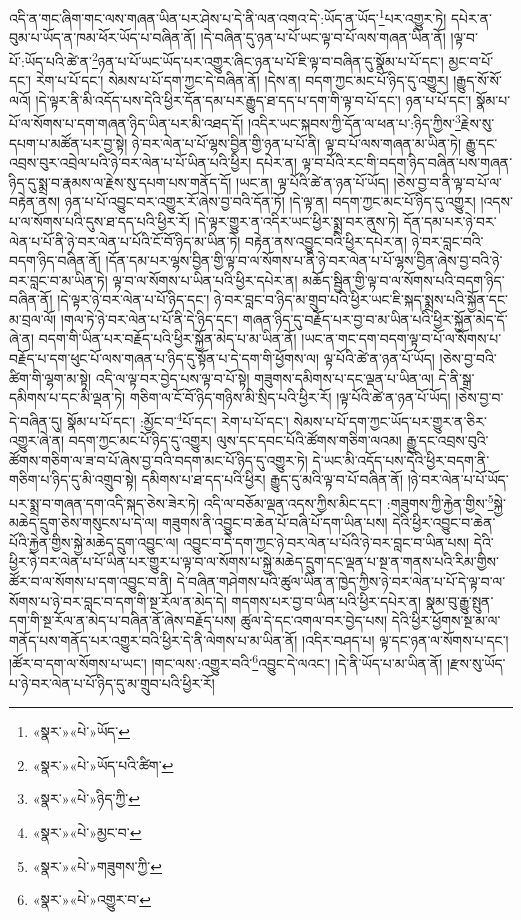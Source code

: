 འདི་ན་གང་ཞིག་གང་ལས་གཞན་ཡིན་པར་ཤེས་པ་དེ་ནི་ལན་འགའ་དེ་:ཡོད་ན་ཡོད་\footnote{«སྣར་»«པེ་»ཡོད་}པར་འགྱུར་ཏེ། དཔེར་ན་བུམ་པ་ཡོད་ན་ཁམ་ཕོར་ཡོད་པ་བཞིན་ནོ། །དེ་བཞིན་དུ་ཉན་པ་པོ་ཡང་ལྟ་བ་པོ་ལས་གཞན་ཡིན་ནོ། །ལྟ་བ་པོ་:ཡོད་པའི་ཚེ་ན་\footnote{«སྣར་»«པེ་»ཡོད་པའི་ཚིག་}ཉན་པ་པོ་ཡང་ཡོད་པར་འགྱུར་ཞིང་ཉན་པ་པོ་ཇི་ལྟ་བ་བཞིན་དུ་སྣོམ་པ་པོ་དང་། མྱང་བ་པོ་དང་། རེག་པ་པོ་དང་། སེམས་པ་པོ་དག་ཀྱང་དེ་བཞིན་ནོ། །དེས་ན། བདག་ཀྱང་མང་པོ་ཉིད་དུ་འགྱུར། །རྒྱུད་སོ་སོ་ལའོ། །དེ་ལྟར་ནི་མི་འདོད་པས་དེའི་ཕྱིར་དོན་དམ་པར་རྒྱུད་ཐ་དད་པ་དག་གི་ལྟ་བ་པོ་དང་། ཉན་པ་པོ་དང་། སྣོམ་པ་པོ་ལ་སོགས་པ་དག་གཞན་ཉིད་ཡིན་པར་མི་འཐད་དོ། །འདིར་ཡང་སྐབས་ཀྱི་དོན་ལ་ཕན་པ་:ཉིད་ཀྱིས་\footnote{«སྣར་»«པེ་»ཉིད་ཀྱི་}རྗེས་སུ་དཔག་པ་མཚོན་པར་བྱ་སྟེ། ཉེ་བར་ལེན་པ་པོ་ལྷས་བྱིན་གྱི་ཉན་པ་པོ་ནི། ལྟ་བ་པོ་ལས་གཞན་མ་ཡིན་ཏེ། རྒྱུ་དང་འབྲས་བུར་འབྲེལ་པའི་ཉེ་བར་ལེན་པ་པོ་ཡིན་པའི་ཕྱིར། དཔེར་ན། ལྟ་བ་པོའི་རང་གི་བདག་ཉིད་བཞིན་པས་གཞན་ཉིད་དུ་སྨྲ་བ་རྣམས་ལ་རྗེས་སུ་དཔག་པས་གནོད་དོ། །ཡང་ན། ལྟ་པོའི་ཚེ་ན་ཉན་པོ་ཡོད། །ཅེས་བྱ་བ་ནི་ལྟ་བ་པོ་ལ་བརྟེན་ནས། ཉན་པ་པོ་འབྱུང་བར་འགྱུར་རོ་ཞེས་བྱ་བའི་དོན་ཏོ། །དེ་ལྟ་ན། བདག་ཀྱང་མང་པོ་ཉིད་དུ་འགྱུར། །འདས་པ་ལ་སོགས་པའི་དུས་ཐ་དད་པའི་ཕྱིར་རོ། །དེ་ལྟར་གྱུར་ན་འདིར་ཡང་ཕྱིར་སྨྲ་བར་ནུས་ཏེ། དོན་དམ་པར་ཉེ་བར་ལེན་པ་པོ་ནི་ཉེ་བར་ལེན་པ་པོའི་ངོ་བོ་ཉིད་མ་ཡིན་ཏེ། བརྟེན་ནས་འབྱུང་བའི་ཕྱིར་དཔེར་ན། ཉེ་བར་བླང་བའི་བདག་ཉིད་བཞིན་ནོ། །དོན་དམ་པར་ལྷས་བྱིན་གྱི་ལྟ་བ་ལ་སོགས་པ་ནི་ཉེ་བར་ལེན་པ་པོ་ལྷས་བྱིན་ཞེས་བྱ་བའི་ཉེ་བར་བླང་བ་མ་ཡིན་ཏེ། ལྟ་བ་ལ་སོགས་པ་ཡིན་པའི་ཕྱིར་དཔེར་ན། མཆོད་སྦྱིན་གྱི་ལྟ་བ་ལ་སོགས་པའི་བདག་ཉིད་བཞིན་ནོ། །དེ་ལྟར་ཉེ་བར་ལེན་པ་པོ་ཉིད་དང་། ཉེ་བར་བླང་བ་ཉིད་མ་གྲུབ་པའི་ཕྱིར་ཡང་ཇི་སྐད་སྨྲས་པའི་སྐྱོན་དང་མ་བྲལ་ལོ། །གལ་ཏེ་ཉེ་བར་ལེན་པ་པོ་ནི་དེ་ཉིད་དང་། གཞན་ཉིད་དུ་བརྗོད་པར་བྱ་བ་མ་ཡིན་པའི་ཕྱིར་སྐྱོན་མེད་དོ་ཞེ་ན། བདག་གི་ཡིན་པར་བརྗོད་པའི་ཕྱིར་སྐྱོན་མེད་པ་མ་ཡིན་ནོ། །ཡང་ན་གང་དག་བདག་ལྟ་བ་པོ་ལ་སོགས་པ་བརྗོད་པ་དག་ཕུང་པོ་ལས་གཞན་པ་ཉིད་དུ་སྟོན་པ་དེ་དག་གི་ཕྱོགས་ལ། ལྟ་པོའི་ཚེ་ན་ཉན་པོ་ཡོད། །ཅེས་བྱ་བའི་ཚིག་གི་ལྷག་མ་སྟེ། འདི་ལ་ལྟ་བར་བྱེད་པས་ལྟ་བ་པོ་སྟེ། གཟུགས་དམིགས་པ་དང་ལྡན་པ་ཡིན་ལ། དེ་ནི་སྒྲ་དམིགས་པ་དང་མི་ལྡན་ཏེ། གཅིག་ལ་ངོ་བོ་ཉིད་གཉིས་མི་སྲིད་པའི་ཕྱིར་རོ། །ལྟ་པོའི་ཚེ་ན་ཉན་པོ་ཡོད། །ཅེས་བྱ་བ་དེ་བཞིན་དུ། སྣོམ་པ་པོ་དང་། :མྱོང་བ་\footnote{«སྣར་»«པེ་»མྱང་བ་}པོ་དང་། རེག་པ་པོ་དང་། སེམས་པ་པོ་དག་ཀྱང་ཡོད་པར་གྱུར་ན་ཅིར་འགྱུར་ཞེ་ན། བདག་ཀྱང་མང་པོ་ཉིད་དུ་འགྱུར། ལུས་དང་དབང་པོའི་ཚོགས་གཅིག་ལའམ། རྒྱུ་དང་འབྲས་བུའི་ཚོགས་གཅིག་ལ་ཟ་བ་པོ་ཞེས་བྱ་བའི་བདག་མང་པོ་ཉིད་དུ་འགྱུར་ཏེ། དེ་ཡང་མི་འདོད་པས་དེའི་ཕྱིར་བདག་ནི་གཅིག་པ་ཉིད་དུ་མི་འགྲུབ་སྟེ། དམིགས་པ་ཐ་དད་པའི་ཕྱིར། རྒྱུད་དུ་མའི་ལྟ་བ་པོ་བཞིན་ནོ། །ཉེ་བར་ལེན་པ་པོ་ཡོད་པར་སྨྲ་བ་གཞན་དག་འདི་སྐད་ཅེས་ཟེར་ཏེ། འདི་ལ་བཅོམ་ལྡན་འདས་ཀྱིས་མིང་དང་། :གཟུགས་ཀྱི་རྐྱེན་གྱིས་\footnote{«སྣར་»«པེ་»གཟུགས་ཀྱི་}སྐྱེ་མཆེད་དྲུག་ཅེས་གསུངས་པ་དེ་ལ། གཟུགས་ནི་འབྱུང་བ་ཆེན་པོ་བཞི་པོ་དག་ཡིན་པས། དེའི་ཕྱིར་འབྱུང་བ་ཆེན་པོའི་རྐྱེན་གྱིས་སྐྱེ་མཆེད་དྲུག་འབྱུང་ལ། འབྱུང་བ་དེ་དག་ཀྱང་ཉེ་བར་ལེན་པ་པོའི་ཉེ་བར་བླང་བ་ཡིན་པས། དེའི་ཕྱིར་ཉེ་བར་ལེན་པ་པོ་ཡིན་པར་གྱུར་པ་ལྟ་བ་ལ་སོགས་པ་སྐྱེ་མཆེད་དྲུག་དང་ལྡན་པ་སྔ་ན་གནས་པའི་རིམ་གྱིས་ཚོར་བ་ལ་སོགས་པ་དག་འབྱུང་བ་ནི། དེ་བཞིན་གཤེགས་པའི་ཚུལ་ཡིན་ན་ཁྱེད་ཀྱིས་ཉེ་བར་ལེན་པ་པོ་དེ་ལྟ་བ་ལ་སོགས་པ་ཉེ་བར་བླང་བ་དག་གི་སྔ་རོལ་ན་མེད་དེ། གདགས་པར་བྱ་བ་ཡིན་པའི་ཕྱིར་དཔེར་ན། སྣམ་བུ་རྒྱུ་སྤུན་དག་གི་སྔ་རོལ་ན་མེད་པ་བཞིན་ནོ་ཞེས་བརྗོད་པས། ཚུལ་དེ་དང་འགལ་བར་བྱེད་པས། དེའི་ཕྱིར་ཕྱོགས་སྔ་མ་ལ་གནོད་པས་གནོད་པར་འགྱུར་བའི་ཕྱིར་དེ་ནི་ལེགས་པ་མ་ཡིན་ནོ། །འདིར་བཤད་པ། ལྟ་དང་ཉན་ལ་སོགས་པ་དང་། །ཚོར་བ་དག་ལ་སོགས་པ་ཡང་། །གང་ལས་:འགྱུར་བའི་\footnote{«སྣར་»«པེ་»འགྱུར་བ་}འབྱུང་དེ་ལའང་། །དེ་ནི་ཡོད་པ་མ་ཡིན་ནོ། །རྫས་སུ་ཡོད་པ་ཉེ་བར་ལེན་པ་པོ་ཉིད་དུ་མ་གྲུབ་པའི་ཕྱིར་རོ། 
